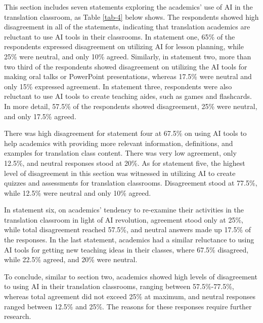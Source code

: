\documentclass[english]{textolivre}
\begin{document}
This section includes seven statements exploring the academics’ use of AI in the translation classroom, as Table \ref{tab-4} below shows. The respondents showed high disagreement in all of the statements, indicating that translation academics are reluctant to use AI tools in their classrooms. In statement one, 65\% of the respondents expressed disagreement on utilizing AI for lesson planning, while 25\% were neutral, and only 10\% agreed. Similarly, in statement two, more than two third of the respondents showed disagreement on utilizing the AI tools for making oral talks or PowerPoint presentations, whereas 17.5\% were neutral and only 15\% expressed agreement. In statement three, respondents were also reluctant to use AI tools to create teaching aides, such as games and flashcards. In more detail, 57.5\% of the respondents showed disagreement, 25\% were neutral, and only 17.5\% agreed.

There was high disagreement for statement four at 67.5\% on using AI tools to help academics with providing more relevant information, definitions, and examples for translation class content. There was very low agreement, only 12.5\%, and neutral responses stood at 20\%. As for statement five, the highest level of disagreement in this section was witnessed in utilizing AI to create quizzes and assessments for translation classrooms. Disagreement stood at 77.5\%, while 12.5\% were neutral and only 10\% agreed.

In statement six, on academics’ tendency to re-examine their activities in the translation classroom in light of AI revolution, agreement stood only at 25\%, while total disagreement reached 57.5\%, and neutral answers made up 17.5\% of the responses. In the last statement, academics had a similar reluctance to using AI tools for getting new teaching ideas in their classes, where 67.5\% disagreed, while 22.5\% agreed, and 20\% were neutral.

To conclude, similar to section two, academics showed high levels of disagreement to using AI in their translation classrooms, ranging between 57.5\%-77.5\%, whereas total agreement did not exceed 25\% at maximum, and neutral responses ranged between 12.5\% and 25\%. The reasons for these responses require further research.
\end{document}
